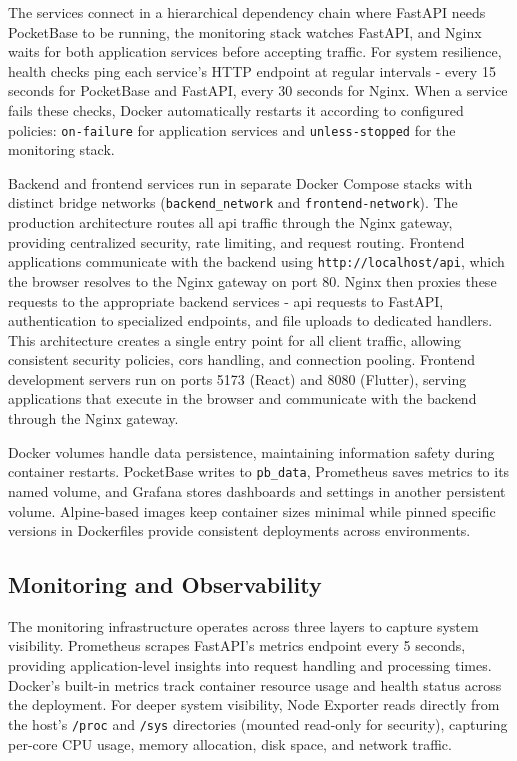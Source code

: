 The services connect in a hierarchical dependency chain where FastAPI needs PocketBase to be running, the monitoring stack watches FastAPI, and Nginx waits for both application services before accepting traffic. For system resilience, health checks ping each service's HTTP endpoint at regular intervals - every 15 seconds for PocketBase and FastAPI, every 30 seconds for Nginx. When a service fails these checks, Docker automatically restarts it according to configured policies: \texttt{on-failure} for application services and \texttt{unless-stopped} for the monitoring stack.

Backend and frontend services run in separate Docker Compose stacks with distinct bridge networks (\texttt{backend\_network} and \texttt{frontend-network}). The production architecture routes all \ac{api} traffic through the Nginx gateway, providing centralized security, rate limiting, and request routing. Frontend applications communicate with the backend using \texttt{http://localhost/api}, which the browser resolves to the Nginx gateway on port 80. Nginx then proxies these requests to the appropriate backend services - \ac{api} requests to FastAPI, authentication to specialized endpoints, and file uploads to dedicated handlers. This architecture creates a single entry point for all client traffic, allowing consistent security policies, \ac{cors} handling, and connection pooling. Frontend development servers run on ports 5173 (React) and 8080 (Flutter), serving applications that execute in the browser and communicate with the backend through the Nginx gateway.

Docker volumes handle data persistence, maintaining information safety during container restarts. PocketBase writes to \texttt{pb\_data}, Prometheus saves metrics to its named volume, and Grafana stores dashboards and settings in another persistent volume. Alpine-based images keep container sizes minimal while pinned specific versions in Dockerfiles provide consistent deployments across environments.

\subsection{Monitoring and Observability} \label{subsection:monitoring_observability}

The monitoring infrastructure operates across three layers to capture system visibility. Prometheus scrapes FastAPI's metrics endpoint every 5 seconds, providing application-level insights into request handling and processing times. Docker's built-in metrics track container resource usage and health status across the deployment. For deeper system visibility, Node Exporter reads directly from the host's \texttt{/proc} and \texttt{/sys} directories (mounted read-only for security), capturing per-core CPU usage, memory allocation, disk space, and network traffic.

